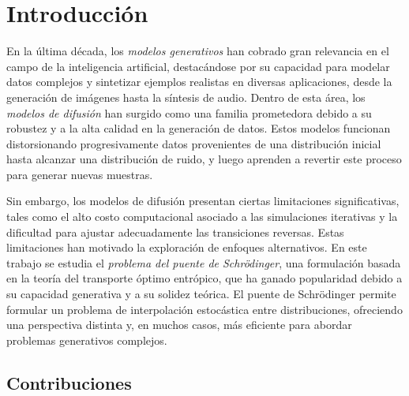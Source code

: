 \chapter*{Introducción}

En la última década, los \textit{modelos generativos} han cobrado gran relevancia en el campo de la inteligencia artificial, destacándose por su capacidad para modelar datos complejos y sintetizar ejemplos realistas en diversas aplicaciones, desde la generación de imágenes hasta la síntesis de audio. Dentro de esta área, los \textit{modelos de difusión} han surgido como una familia prometedora debido a su robustez y a la alta calidad en la generación de datos. Estos modelos funcionan distorsionando progresivamente datos provenientes de una distribución inicial hasta alcanzar una distribución de ruido, y luego aprenden a revertir este proceso para generar nuevas muestras.

Sin embargo, los modelos de difusión presentan ciertas limitaciones significativas, tales como el alto costo computacional asociado a las simulaciones iterativas y la dificultad para ajustar adecuadamente las transiciones reversas. Estas limitaciones han motivado la exploración de enfoques alternativos. En este trabajo se estudia el \textit{problema del puente de Schrödinger}, una formulación basada en la teoría del transporte óptimo entrópico, que ha ganado popularidad debido a su capacidad generativa y a su solidez teórica. El puente de Schrödinger permite formular un problema de interpolación estocástica entre distribuciones, ofreciendo una perspectiva distinta y, en muchos casos, más eficiente para abordar problemas generativos complejos.

\section*{Contribuciones}

